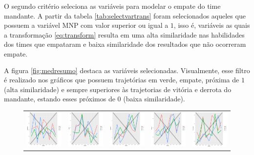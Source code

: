 \documentclass[review]{elsarticle}
\begin{document}
O segundo critério seleciona as variáveis para modelar o empate do time mandante. A partir da tabela \ref{tab:selectvartrans} foram selecionados aqueles que possuem a variável MNP com valor superior ou igual a $1$, isso é, variáveis as quais a transformação \ref{eq:transform} resulta em uma alta similaridade nas habilidades dos times que empataram e baixa similaridade dos resultados que não ocorreram empate.



A figura \ref{fig:medresumo} destaca as variáveis selecionadas. Visualmente, esse filtro é realizado nos gráficos que possuem trajetórias em verde, empate, próxima de $1$ (alta similaridade) e sempre superiores às trajetorias de vitória e derrota do mandante, estando esses próximos de $0$ (baixa similaridade).

\begin{figure}
\begin{tabular}{ccccc}
  \includegraphics[width=25mm]{aceleracao_result_trans} & \includegraphics[width=25mm]{altura_result_trans} & \includegraphics[width=25mm]{cabeceio_result_trans} &   \includegraphics[width=25mm]{carrinho_result_trans} &
  \includegraphics[width=25mm]{ch_delonge_result_trans} \\

\end{tabular}
\end{figure}
\end{document}
